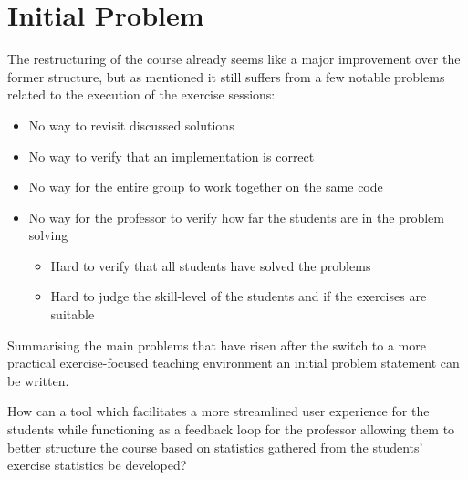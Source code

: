 \section{Initial Problem} \label{sec:initial-problem}
The restructuring of the course already seems like a major improvement over the former structure, but as mentioned it still suffers from a few notable problems related to the execution of the exercise sessions:
\begin{itemize}
	\item No way to revisit discussed solutions
	\item No way to verify that an implementation is correct
	\item No way for the entire group to work together on the same code
	\item No way for the professor to verify how far the students are in the problem solving
	\begin{itemize}
		\item Hard to verify that all students have solved the problems
		\item Hard to judge the skill-level of the students and if the exercises are suitable
	\end{itemize}
\end{itemize}

Summarising the main problems that have risen after the switch to a more practical exercise-focused teaching environment an initial problem statement can be written.
\begin{displayquote}
How can a tool which facilitates a more streamlined user experience for the students while functioning as a feedback loop for the professor allowing them to better structure the course based on statistics gathered from the students' exercise statistics be developed?
\end{displayquote} 

